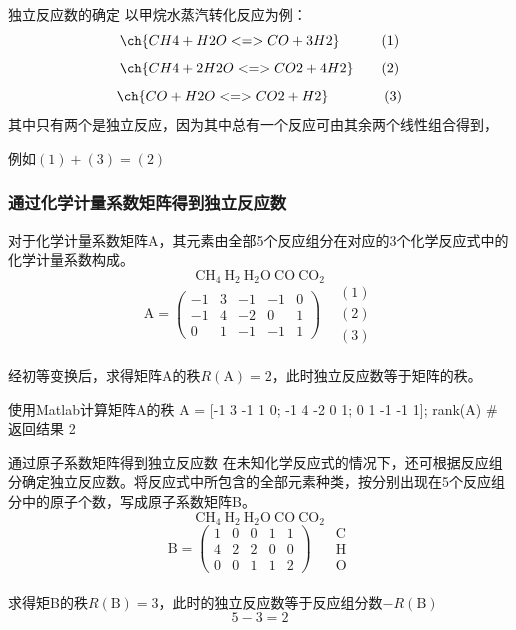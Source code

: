 \begin{frame}{独立反应数的确定}
	以甲烷水蒸汽转化反应为例：
    \[
        \ch{CH4 + H2O <=> CO + 3 H2} \qquad \quad (1)
    \]
    \[
        \ch{CH4 + 2 H2O <=> CO2 + 4 H2} \qquad (2)
    \]
    \[
        \ch{CO + H2O <=> CO2 + H2} \qquad \quad \quad (3)
    \]
	其中只有两个是独立反应，因为其中总有一个反应可由其余两个线性组合得到，

    例如$(1)+(3)=(2)$
\end{frame}


\begin{frame}[fragile]
    \frametitle{通过化学计量系数矩阵得到独立反应数}
	对于化学计量系数矩阵A，其元素由全部5个反应组分在对应的3个化学反应式中的化学计量系数构成。
	$$\mathrm{CH_4~H_2~H_2O~CO~CO_2}$$
	$$\mathrm{A} = \begin{pmatrix}
	-1&  3&  -1&  -1& 0\\
	-1&  4&  -2&  0& 1\\
	0&  1&  -1&  -1& 1
\end{pmatrix}~~~~
\begin{matrix}
	(1)\\
	(2)\\
	(3)
\end{matrix}$$
	\\经初等变换后，求得矩阵A的秩$R(\mathrm{A})=2$，此时独立反应数等于矩阵的秩。
    \begin{codeblock}{使用Matlab计算矩阵A的秩}
A = [-1 3 -1 1 0; -1 4 -2 0 1; 0 1 -1 -1 1];
rank(A) # 返回结果 2
    \end{codeblock}
\end{frame}


\begin{frame}{通过原子系数矩阵得到独立反应数}
	在未知化学反应式的情况下，还可根据反应组分确定独立反应数。将反应式中所包含的全部元素种类，按分别出现在5个反应组分中的原子个数，写成原子系数矩阵B。
	$$\mathrm{CH_4~H_2~H_2O~CO~CO_2}$$
	$$\mathrm{B} = \begin{pmatrix}
		1&  0&  0&  1& 1\\
		4&  2&  2&  0& 0\\
		0&  0&  1&  1& 2
	\end{pmatrix}~~~~~~ 
	\begin{matrix}
		\mathrm{C}\\
		\mathrm{H}\\
		\mathrm{O}
	\end{matrix}$$
	\\求得矩B的秩$R(\mathrm{B})=3$，此时的独立反应数等于反应组分数$-R(\mathrm{B})$
	$$5-3=2$$
	\end{frame}



